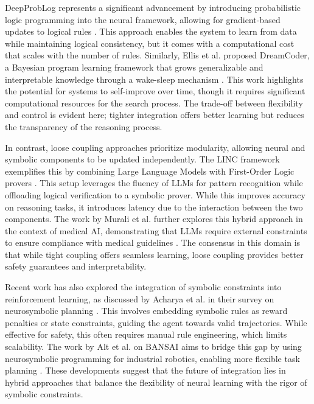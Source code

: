 \documentclass{article}
\begin{document}
DeepProbLog represents a significant advancement by introducing probabilistic logic programming into the neural framework, allowing for gradient-based updates to logical rules \cite{naito2026prediction}. This approach enables the system to learn from data while maintaining logical consistency, but it comes with a computational cost that scales with the number of rules. Similarly, Ellis et al. proposed DreamCoder, a Bayesian program learning framework that grows generalizable and interpretable knowledge through a wake-sleep mechanism \cite{ellis2023dreamcoder}. This work highlights the potential for systems to self-improve over time, though it requires significant computational resources for the search process. The trade-off between flexibility and control is evident here; tighter integration offers better learning but reduces the transparency of the reasoning process.

In contrast, loose coupling approaches prioritize modularity, allowing neural and symbolic components to be updated independently. The LINC framework exemplifies this by combining Large Language Models with First-Order Logic provers \cite{olausson2023linc}. This setup leverages the fluency of LLMs for pattern recognition while offloading logical verification to a symbolic prover. While this improves accuracy on reasoning tasks, it introduces latency due to the interaction between the two components. The work by Murali et al. further explores this hybrid approach in the context of medical AI, demonstrating that LLMs require external constraints to ensure compliance with medical guidelines \cite{murali2025integrating}. The consensus in this domain is that while tight coupling offers seamless learning, loose coupling provides better safety guarantees and interpretability.

Recent work has also explored the integration of symbolic constraints into reinforcement learning, as discussed by Acharya et al. in their survey on neurosymbolic planning \cite{acharya2023neurosymbolic}. This involves embedding symbolic rules as reward penalties or state constraints, guiding the agent towards valid trajectories. While effective for safety, this often requires manual rule engineering, which limits scalability. The work by Alt et al. on BANSAI aims to bridge this gap by using neurosymbolic programming for industrial robotics, enabling more flexible task planning \cite{alt2024bansai}. These developments suggest that the future of integration lies in hybrid approaches that balance the flexibility of neural learning with the rigor of symbolic constraints.
\end{document}
